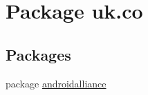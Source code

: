 \hypertarget{namespaceuk_1_1co}{}\section{Package uk.\+co}
\label{namespaceuk_1_1co}
\subsection*{Packages}
\begin{DoxyCompactItemize}
\item 
package \hyperlink{namespaceuk_1_1co_1_1androidalliance}{androidalliance}
\end{DoxyCompactItemize}
